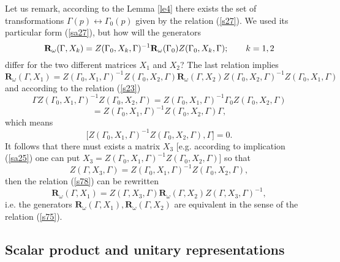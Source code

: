 \documentclass[a4paper,a4paper]{article}
\begin{document}
Let us remark, according to the Lemma \ref{le4} there exists the set of
transformations $\Gamma (p)\leftrightarrow \Gamma _{0}(p)$ given by the
relation (\ref{s27}). We used its particular form (\ref{sa27}), but how will
the generators 
\begin{equation}
\mathbf{R}_{\omega }(\Gamma ,X_{k})=Z(\Gamma _{0},X_{k},\Gamma )^{-1}\mathbf{%
R}_{\omega }(\Gamma _{0})Z(\Gamma _{0},X_{k},\Gamma );\qquad k=1,2
\label{s77}
\end{equation}%
differ for the two different matrices $X_{1}$ and $X_{2}$? The last relation
implies 
\begin{equation}
\mathbf{R}_{\omega }(\Gamma ,X_{1})=Z(\Gamma _{0},X_{1},\Gamma
)^{-1}Z(\Gamma _{0},X_{2},\Gamma )\mathbf{R}_{\omega }(\Gamma
,X_{2})Z(\Gamma _{0},X_{2},\Gamma )^{-1}Z(\Gamma _{0},X_{1},\Gamma )
\label{s78}
\end{equation}%
and according to the relation (\ref{s23})%
\begin{equation}
\Gamma Z(\Gamma _{0},X_{1},\Gamma )^{-1}Z(\Gamma _{0},X_{2},\Gamma
)=Z(\Gamma _{0},X_{1},\Gamma )^{-1}\Gamma _{0}Z(\Gamma _{0},X_{2},\Gamma )
\label{s79}
\end{equation}%
\begin{equation*}
=Z(\Gamma _{0},X_{1},\Gamma )^{-1}Z(\Gamma _{0},X_{2},\Gamma )\Gamma ,
\end{equation*}%
which means 
\begin{equation}
\lbrack Z(\Gamma _{0},X_{1},\Gamma )^{-1}Z(\Gamma _{0},X_{2},\Gamma ),\Gamma
]=0.  \label{s80}
\end{equation}%
It follows that there must exists a matrix $X_{3}$ [e.g. according to
implication (\ref{sa25}) one can put $X_{3}=Z(\Gamma _{0},X_{1},\Gamma
)^{-1}Z(\Gamma _{0},X_{2},\Gamma )$] so that 
\begin{equation}
Z(\Gamma ,X_{3},\Gamma )=Z(\Gamma _{0},X_{1},\Gamma )^{-1}Z(\Gamma
_{0},X_{2},\Gamma ),  \label{s81}
\end{equation}%
then the relation (\ref{s78}) can be rewritten 
\begin{equation}
\mathbf{R}_{\omega }(\Gamma ,X_{1})=Z(\Gamma ,X_{3},\Gamma )\mathbf{R}%
_{\omega }(\Gamma ,X_{2})Z(\Gamma ,X_{3},\Gamma )^{-1},  \label{s82}
\end{equation}%
i.e. the generators $\mathbf{R}_{\omega }(\Gamma ,X_{1}),\mathbf{R}_{\omega
}(\Gamma ,X_{2})$ are equivalent in the sense of the relation (\ref{s75}).

\subsection{Scalar product and unitary representations}
\end{document}
